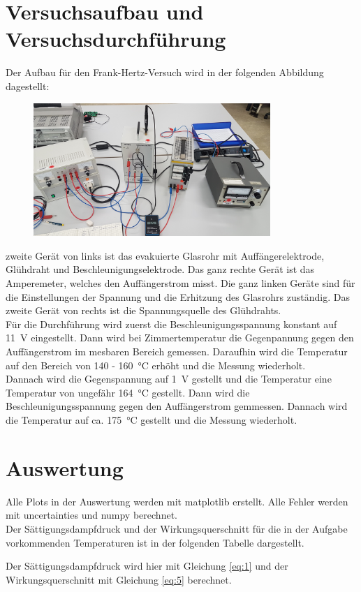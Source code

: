 \section{Versuchsaufbau und Versuchsdurchführung}\justifying
Der Aufbau für den Frank-Hertz-Versuch wird in der folgenden Abbildung dagestellt:
\begin{figure}[H]
    \centering
    \includegraphics[width=0.8\textwidth]{images/Aufbau.jpg}
    \caption{} %
    \label{fig:4}
\end{figure}
 zweite Gerät von links ist das evakuierte Glasrohr mit Auffängerelektrode, Glühdraht und
Beschleunigungselektrode. Das ganz rechte Gerät ist das Amperemeter, welches den
Auffängerstrom misst. Die ganz linken Geräte sind für die Einstellungen der Spannung und 
die Erhitzung des Glasrohrs zuständig. Das zweite Gerät von rechts ist die Spannungsquelle
des Glühdrahts.\\
Für die Durchführung wird zuerst die Beschleunigungsspannung konstant auf \SI{11}{\volt} eingestellt.
Dann wird bei Zimmertemperatur die Gegenpannung gegen den Auffängerstrom im mesbaren Bereich gemessen.
Daraufhin wird die Temperatur auf den Bereich von 140 - \SI{160}{\celsius} erhöht und die Messung wiederholt.\\
Dannach wird die Gegenspannung auf \SI{1}{\volt} gestellt und die Temperatur eine Temperatur von
ungefähr \SI{164}{\celsius} gestellt. Dann wird die Beschleunigungsspannung gegen
den Auffängerstrom gemmessen. Dannach wird die Temperatur auf ca. \SI{175}{\celsius} gestellt 
und die Messung wiederholt.



\section{Auswertung}
Alle Plots in der Auswertung werden mit matplotlib \cite{matplotlib} erstellt.
Alle Fehler werden mit uncertainties \cite{uncertainties} und numpy \cite{numpy} berechnet.\\
Der Sättigungsdampfdruck und der Wirkungsquerschnitt für die in der Aufgabe vorkommenden
Temperaturen ist in der folgenden Tabelle dargestellt.

Der Sättigungsdampfdruck wird hier mit Gleichung \eqref{eq:1} und der Wirkungsquerschnitt 
mit Gleichung \eqref{eq:5} berechnet.

